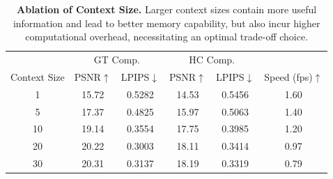 \begin{table}[t]

\tabcolsep=0.09cm
\center
\begin{tabular}{c | c c | c c | c}
\toprule
& \multicolumn{2}{c}{GT Comp.} & \multicolumn{2}{c}{HC Comp.} &\\
  Context Size  & PSNR$\uparrow$ & LPIPS$\downarrow$ & PSNR$\uparrow$ & LPIPS$\downarrow$  & Speed (fps)$\uparrow$ \\
  \hline
  \hline
   1 & 15.72 & 0.5282 & 14.53 & 0.5456 & 1.60 \\
   5 & 17.37 & 0.4825 & 15.97 & 0.5063 & 1.40 \\
   10 & 19.14 & 0.3554 & 17.75 & 0.3985 & 1.20 \\
   20 & 20.22 & 0.3003 & 18.11 & 0.3414 & 0.97 \\ 
   30 & 20.31 & 0.3137 & 18.19 & 0.3319 & 0.79 \\
\bottomrule

\end{tabular}
\caption{\textbf{Ablation of Context Size.} Larger context sizes contain more useful information and lead to better memory capability, but also incur higher computational overhead, necessitating an optimal trade-off choice.}
\vspace{-0.6cm}
\label{table:ablation_context}
\end{table}